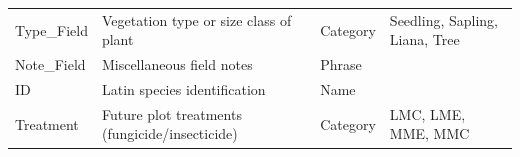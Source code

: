\documentclass[
  12pt,
]{article}
\begin{document}
\begin{longtable}[]{@{}llll@{}}
\begin{minipage}[t]{0.18\columnwidth}\raggedright
Type\_Field\strut
\end{minipage} & \begin{minipage}[t]{0.35\columnwidth}\raggedright
Vegetation type or size class of plant\strut
\end{minipage} & \begin{minipage}[t]{0.18\columnwidth}\raggedright
Category\strut
\end{minipage} & \begin{minipage}[t]{0.18\columnwidth}\raggedright
Seedling, Sapling, Liana, Tree\strut
\end{minipage}\tabularnewline
\begin{minipage}[t]{0.18\columnwidth}\raggedright
Note\_Field\strut
\end{minipage} & \begin{minipage}[t]{0.35\columnwidth}\raggedright
Miscellaneous field notes\strut
\end{minipage} & \begin{minipage}[t]{0.18\columnwidth}\raggedright
Phrase\strut
\end{minipage} & \begin{minipage}[t]{0.18\columnwidth}\raggedright
\strut
\end{minipage}\tabularnewline
\begin{minipage}[t]{0.18\columnwidth}\raggedright
ID\strut
\end{minipage} & \begin{minipage}[t]{0.35\columnwidth}\raggedright
Latin species identification\strut
\end{minipage} & \begin{minipage}[t]{0.18\columnwidth}\raggedright
Name\strut
\end{minipage} & \begin{minipage}[t]{0.18\columnwidth}\raggedright
\strut
\end{minipage}\tabularnewline
\begin{minipage}[t]{0.18\columnwidth}\raggedright
Treatment\strut
\end{minipage} & \begin{minipage}[t]{0.35\columnwidth}\raggedright
Future plot treatments (fungicide/insecticide)\strut
\end{minipage} & \begin{minipage}[t]{0.18\columnwidth}\raggedright
Category\strut
\end{minipage} & \begin{minipage}[t]{0.18\columnwidth}\raggedright
LMC, LME, MME, MMC\strut
\end{minipage}\tabularnewline
\bottomrule
\end{longtable}
\end{document}
